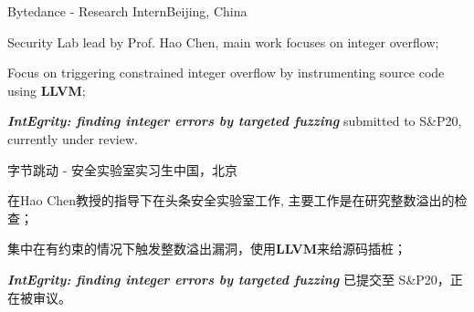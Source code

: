 \renewcommand{\timeInterval}{ - \present}

\ifx\lang\eng
	\begin{rSubsection}{Bytedance}{\timeInterval}{Research Intern}{Beijing, China}
		\item Security Lab lead by Prof. Hao Chen, main work focuses on integer overflow;
		\item Focus on triggering constrained integer overflow by instrumenting source code using \textbf{LLVM};
		\item \textit{\textbf{IntEgrity: finding integer errors by targeted fuzzing}} submitted to S\&P20, currently under review.
	\end{rSubsection}
\else
	\begin{rSubsection}{字节跳动}{\timeInterval}{安全实验室实习生}{中国，北京}
		\item 在Hao Chen教授的指导下在头条安全实验室工作, 主要工作是在研究整数溢出的检查；
		\item 集中在有约束的情况下触发整数溢出漏洞，使用\textbf{LLVM}来给源码插桩；
		\item \textit{\textbf{IntEgrity: finding integer errors by targeted fuzzing}} 已提交至 S\&P20，正在被审议。
	\end{rSubsection}
\fi

\renewcommand{\timeInterval}{}